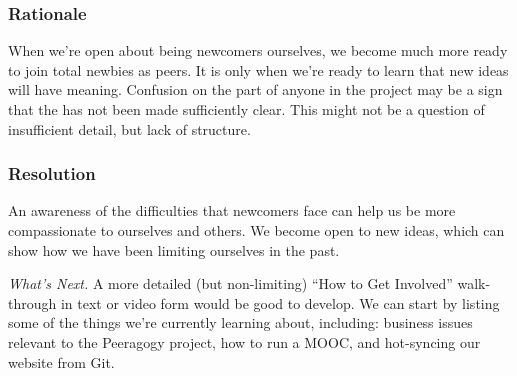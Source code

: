 \subsubsection*{Rationale} 
When we're open about being newcomers ourselves,
we become much more ready to join total newbies as peers.
It is only when we're ready to learn that new ideas will have meaning.
Confusion on the part of anyone in the project may be a sign that
the  has not been made sufficiently clear.  This might not
be a question of insufficient detail, but lack of structure.  
%
%

\subsubsection*{Resolution}
An awareness of the difficulties that newcomers face can
help us be more compassionate to ourselves and others.  We
become open to new ideas, which can show how we have
been limiting ourselves in the past.

\begin{framed}
\emph{What's Next.}
A more detailed (but non-limiting) ``How to Get Involved'' walk-through in text or video form would be good to develop. We can start by listing some of the things we're currently learning about, including: business issues relevant to the Peeragogy project, how to run a MOOC, and hot-syncing our website from Git.
\end{framed}


